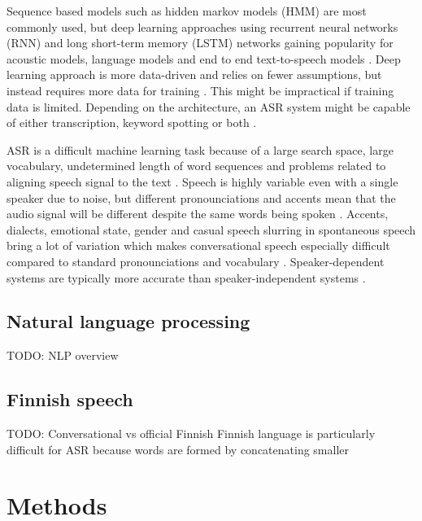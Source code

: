 \documentclass[utf8,english]{gradu3}
\begin{document}
Sequence based models such as hidden markov models (HMM) are most commonly used, but deep learning approaches using recurrent neural networks (RNN) and long short-term memory (LSTM) networks gaining popularity for acoustic models, language models and end to end text-to-speech models \parencite{bengio2014word,enarvi2018modeling}. Deep learning approach is more data-driven and relies on fewer assumptions, but instead requires more data for training \parencite{bengio2014word}. This might be impractical if training data is limited. Depending on the architecture, an ASR system might be capable of either transcription, keyword spotting or both \parencite{juang2005automatic,enarvi2018modeling}.

ASR is a difficult machine learning task because of a large search space, large vocabulary, undetermined length of word sequences and problems related to aligning speech signal to the text \parencite{enarvi2018modeling}. Speech is highly variable even with a single speaker due to noise, but different pronounciations and accents mean that the audio signal will be different despite the same words being spoken \parencite{juang2005automatic}. Accents, dialects, emotional state, gender and casual speech slurring in spontaneous speech bring a lot of variation which makes conversational speech especially difficult compared to standard pronounciations and vocabulary \parencite{benzeghiba2007automatic, juang2005automatic}. Speaker-dependent systems are typically more accurate than speaker-independent systems \parencite{benzeghiba2007automatic,enarvi2018modeling}.

\section{Natural language processing}
TODO: NLP overview \parencite{silfverberg2016finnpos, kanerva2018turku}


\section{Finnish speech}
TODO: Conversational vs official Finnish
Finnish language is particularly difficult for ASR because words are formed by concatenating smaller \parencite{enarvi}



\chapter{Methods}
\end{document}
